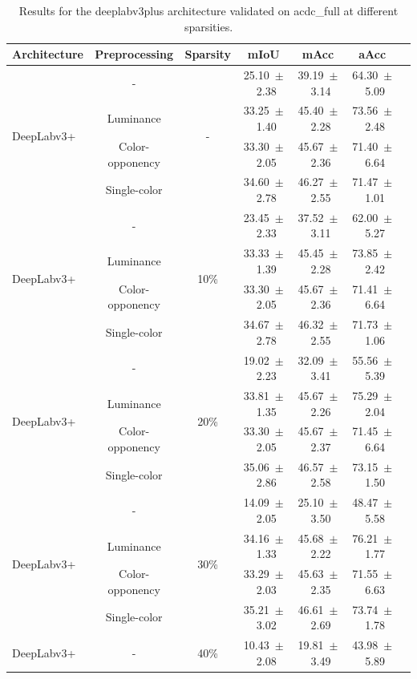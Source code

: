 \begin{table}[h]
\centering
\caption{Results for the deeplabv3plus architecture validated on acdc_full at different sparsities.}
\begin{tabular}{@{}lccc ccc@{}}
\toprule
Architecture & Preprocessing & Sparsity & mIoU & mAcc & aAcc \\
\midrule

\multirow{4}{*}{DeepLabv3+} & - & \multirow{4}{*}{-} & 25.10~$\pm$~2.38 & 39.19~$\pm$~3.14 & 64.30~$\pm$~5.09 \\
& Luminance & & 33.25~$\pm$~1.40 & 45.40~$\pm$~2.28 & 73.56~$\pm$~2.48 \\
& Color-opponency & & 33.30~$\pm$~2.05 & 45.67~$\pm$~2.36 & 71.40~$\pm$~6.64 \\
& Single-color & & 34.60~$\pm$~2.78 & 46.27~$\pm$~2.55 & 71.47~$\pm$~1.01 \\
\midrule
\multirow{4}{*}{DeepLabv3+} & - & \multirow{4}{*}{10\%} & 23.45~$\pm$~2.33 & 37.52~$\pm$~3.11 & 62.00~$\pm$~5.27 \\
& Luminance & & 33.33~$\pm$~1.39 & 45.45~$\pm$~2.28 & 73.85~$\pm$~2.42 \\
& Color-opponency & & 33.30~$\pm$~2.05 & 45.67~$\pm$~2.36 & 71.41~$\pm$~6.64 \\
& Single-color & & 34.67~$\pm$~2.78 & 46.32~$\pm$~2.55 & 71.73~$\pm$~1.06 \\
\midrule
\multirow{4}{*}{DeepLabv3+} & - & \multirow{4}{*}{20\%} & 19.02~$\pm$~2.23 & 32.09~$\pm$~3.41 & 55.56~$\pm$~5.39 \\
& Luminance & & 33.81~$\pm$~1.35 & 45.67~$\pm$~2.26 & 75.29~$\pm$~2.04 \\
& Color-opponency & & 33.30~$\pm$~2.05 & 45.67~$\pm$~2.37 & 71.45~$\pm$~6.64 \\
& Single-color & & 35.06~$\pm$~2.86 & 46.57~$\pm$~2.58 & 73.15~$\pm$~1.50 \\
\midrule
\multirow{4}{*}{DeepLabv3+} & - & \multirow{4}{*}{30\%} & 14.09~$\pm$~2.05 & 25.10~$\pm$~3.50 & 48.47~$\pm$~5.58 \\
& Luminance & & 34.16~$\pm$~1.33 & 45.68~$\pm$~2.22 & 76.21~$\pm$~1.77 \\
& Color-opponency & & 33.29~$\pm$~2.03 & 45.63~$\pm$~2.35 & 71.55~$\pm$~6.63 \\
& Single-color & & 35.21~$\pm$~3.02 & 46.61~$\pm$~2.69 & 73.74~$\pm$~1.78 \\
\midrule
\multirow{4}{*}{DeepLabv3+} & - & \multirow{4}{*}{40\%} & 10.43~$\pm$~2.08 & 19.81~$\pm$~3.49 & 43.98~$\pm$~5.89 \\

\end{tabular}
\end{table}
